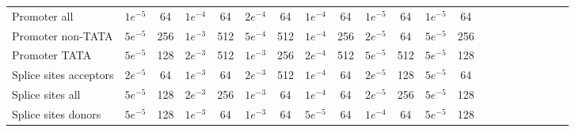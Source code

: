 \begin{table*}[!htb]
\begin{tabular}{@{}l*{20}{c}@{}}
Promoter all & $1e^{-5}$ & 64 & $1e^{-4}$ & 64 & $2e^{-4}$ & 64 & $1e^{-4}$ & 64 & $1e^{-5}$ & 64 & $1e^{-5}$ & 64 \\
Promoter non-TATA & $5e^{-5}$ & 256 & $1e^{-3}$ & 512 & $5e^{-4}$ & 512 & $1e^{-4}$ & 256 & $2e^{-5}$ & 64 & $5e^{-5}$ & 256 \\
Promoter TATA & $5e^{-5}$ & 128 & $2e^{-3}$ & 512 & $1e^{-3}$ & 256 & $2e^{-4}$ & 512 & $5e^{-5}$ & 512 & $5e^{-5}$ & 128 \\
Splice sites acceptors & $2e^{-5}$ & 64 & $1e^{-3}$ & 64 & $2e^{-3}$ & 512 & $1e^{-4}$ & 64 & $2e^{-5}$ & 128 & $5e^{-5}$ & 64 \\
Splice sites all & $5e^{-5}$ & 128 & $2e^{-3}$ & 256 & $1e^{-3}$ & 64 & $1e^{-4}$ & 64 & $2e^{-5}$ & 256 & $5e^{-5}$ & 128 \\
Splice sites donors & $5e^{-5}$ & 128 & $1e^{-3}$ & 64 & $1e^{-3}$ & 64 & $5e^{-5}$ & 64 & $1e^{-4}$ & 64 & $5e^{-5}$ & 128 \\ 
\bottomrule
\end{tabular}
\label{tab:benchmark_hyperparam1}
\end{table*}

